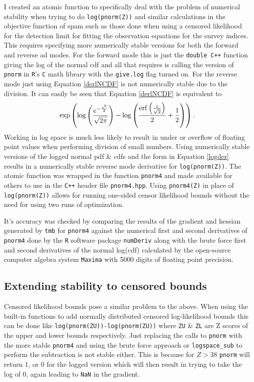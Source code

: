 \documentclass[11pt]{article}\usepackage[]{graphicx}\usepackage[]{color}
\begin{document}
\begin{appendices}
I created an atomic function to specifically deal with the problem of numerical stability when trying to do \texttt{log(pnorm(Z))} and similar calculations in the objective function of \acrshort{spam} such as those done when using a censored likelihood for the detection limit for fitting the observation equations for the survey indices. This requires specifying more numerically stable versions for both the forward and reverse \acrshort{ad} modes. For the forward mode this is just the \texttt{double C++} function giving the log of the normal \acrshort{cdf} and all that requires is calling the version of \texttt{pnorm} in \texttt{R}'s \texttt{C} math library with the \texttt{give.log} flag turned on. For the reverse mode just using Equation \ref{derlNCDF} is not numerically stable due to the division. It can easily be seen that Equation \ref{derlNCDF} is equivalent to 
\begin{equation}\label{logder}
	\exp \left (\log \left({{e^ {- {{z^2}\over{2}} }}\over{\sqrt{2\pi}}}
 \right) - \log \left({{\mathrm{erf}\left({{z}\over{\sqrt{2}}}\right)}\over{2
 }}+{{1}\over{2}}\right) \right).
\end{equation}
 Working in log space is much less likely to result in under or overflow of floating point values when performing division of small numbers. Using numerically stable versions of the logged normal \acrshort{pdf} \& \acrshort{cdf}s and the form in Equation \ref{logder} results in a numerically stable reverse mode derivative for \texttt{log(pnorm(Z))}. The atomic function was wrapped in the function \texttt{pnorm4} and made available for others to use in the \texttt{C++} header file \texttt{pnorm4.hpp}. Using \texttt{pnorm4(Z)} in place of \texttt{log(pnorm(Z))} allows for running one-sided censor likelihood bounds without the need for using two runs of optimization.
 
 It's accuracy was checked by comparing the results of the gradient and hessian generated by \texttt{\acrshort{tmb}} for \texttt{pnorm4} against the numerical first and second derivatives of \texttt{pnorm4} done by the \texttt{R} software package \texttt{numDeriv} along with the brute force first and second derivatives of the normal log(\acrshort{cdf}) calculated by the open-source computer algebra system \texttt{Maxima} with 5000 digits of floating point precision. 
\subsection{Extending stability to censored bounds} 	
Censored likelihood bounds pose a similar problem to the above. When using the built-in functions to add normally distributed censored log-likelihood bounds this can be done like \texttt{log(pnorm(ZU))-log(pnorm(ZU))} where \texttt{ZU} \& \texttt{ZL} are Z scores of the upper and lower bounds respectively. Just replacing the calls to \texttt{pnorm} with the more stable \texttt{pnorm4} and using the brute force approach or \texttt{logspace\_sub} to perform the subtraction is not stable either. This is because for $Z > 38$ \texttt{pnorm} will return 1, or 0 for the logged version which will then result in trying to take the log of 0, again leading to \texttt{NaN} in the gradient.


\end{appendices}
\end{document}
